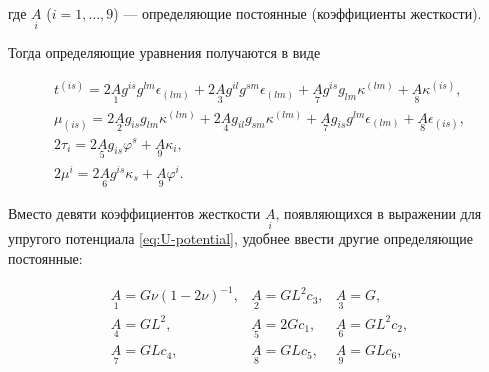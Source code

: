 где \(\underset{i}{A}\) (\(i=1,\ldots, 9\)) \cdash--- определяющие постоянные (коэффициенты жесткости). 

Тогда определяющие уравнения получаются в виде

\begin{equation}

\begin{array}{l}

t^{(is)}=2\underset{1}{A}g^{is}g^{lm}\epsilon_{(lm)}+2\underset{3}{A}g^{il}g^{sm}\epsilon_{(lm)}+

\underset{7}{A}g^{is}g_{lm}\kappa^{(lm)}+\underset{8}{A}\kappa^{(is)},\\

%

\mu_{(is)}=2\underset{2}{A}g_{is}g_{lm}\kappa^{(lm)}+2\underset{4}{A}g_{il}g_{sm}\kappa^{(lm)}+

\underset{7}{A}g_{is}g^{lm}\epsilon_{(lm)}+\underset{8}{A}\epsilon_{(is)},\\

%

2\tau_i=2\underset{5}{A}g_{is}\varphi^s+\underset{9}{A}\kappa_i,\\

%

2\mu^i=2\underset{6}{A}g^{is}\kappa_s+\underset{9}{A}\varphi^i.

\end{array}

\label{eq:constitutive-eq-1}

\end{equation}



Вместо девяти коэффициентов жесткости \(\underset{i}{A}\), появляющихся в выражении для упругого потенциала \eqref{eq:U-potential}, удобнее ввести другие определяющие постоянные:

\begin{equation}

\begin{array}{lll}

\underset{1}{A}=G\nu(1-2\nu)^{-1},&\underset{2}{A}=GL^2c_3, & \underset{3}{A}=G, \\

\underset{4}{A}=GL^2, & \underset{5}{A}=2Gc_1,&\underset{6}{A}=GL^2c_2,\\

\underset{7}{A}=GLc_4,&\underset{8}{A}=GLc_5, & \underset{9}{A}=GLc_6,

\end{array}

\end{equation}

